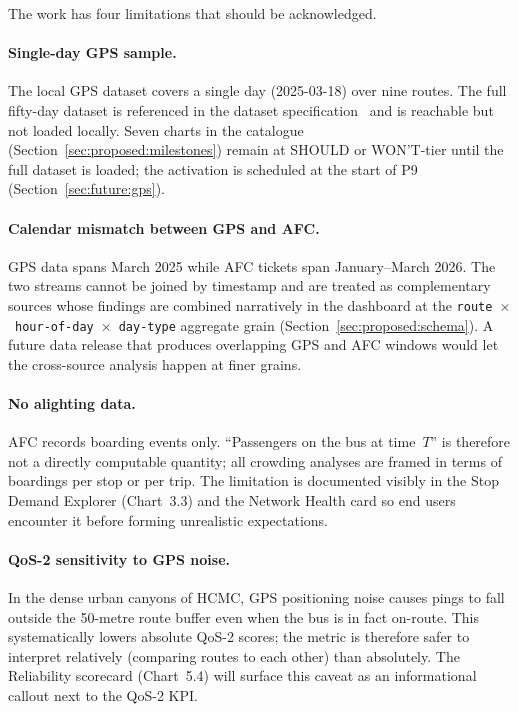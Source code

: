 The work has four limitations that should be acknowledged.

\paragraph{Single-day GPS sample.}
The local GPS dataset covers a single day (2025-03-18) over
nine routes. The full fifty-day dataset is referenced in the
dataset specification~\cite{hcmcgps2025} and is reachable but
not loaded locally. Seven charts in the catalogue
(Section~\ref{sec:proposed:milestones}) remain at SHOULD or
WON'T-tier until the full dataset is loaded; the activation is
scheduled at the start of P9
(Section~\ref{sec:future:gps}).

\paragraph{Calendar mismatch between GPS and AFC.}
GPS data spans March 2025 while AFC tickets span
January--March 2026. The two streams cannot be joined by
timestamp and are treated as complementary sources whose
findings are combined narratively in the dashboard at the
\texttt{route}~$\times$~\texttt{hour-of-day}~$\times$~\texttt{day-type}
aggregate grain (Section~\ref{sec:proposed:schema}). A future
data release that produces overlapping GPS and AFC windows
would let the cross-source analysis happen at finer grains.

\paragraph{No alighting data.}
AFC records boarding events only. ``Passengers on the bus at
time~$T$'' is therefore not a directly computable quantity;
all crowding analyses are framed in terms of boardings per
stop or per trip. The limitation is documented visibly in the
Stop Demand Explorer (Chart~3.3) and the Network Health card
so end users encounter it before forming unrealistic
expectations.

\paragraph{QoS-2 sensitivity to GPS noise.}
In the dense urban canyons of HCMC, GPS positioning noise
causes pings to fall outside the 50-metre route buffer even
when the bus is in fact on-route. This systematically lowers
absolute QoS-2 scores; the metric is therefore safer to
interpret relatively (comparing routes to each other) than
absolutely. The Reliability scorecard (Chart~5.4) will surface
this caveat as an informational callout next to the QoS-2 KPI.

